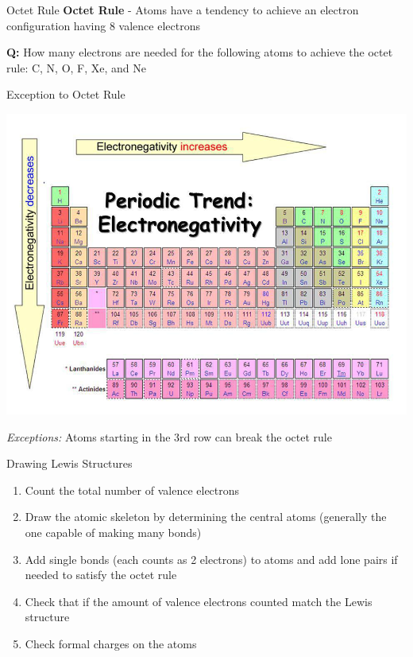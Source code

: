 \documentclass[11pt]{beamer}
\begin{document}
\begin{frame}{Octet Rule}
  \textbf{Octet Rule} - Atoms have a tendency to achieve
  an electron configuration having 8 valence electrons

  \textbf{Q:} How many electrons are needed for the following
  atoms to achieve the octet rule: C, N, O, F, Xe, and Ne
\end{frame}

\begin{frame}{Exception to Octet Rule}
  \begin{center}
    \includegraphics[width=0.75\linewidth]{electronegativity}
  \end{center}
  
  \textit{Exceptions:} Atoms starting in the
    3rd row can break the octet rule

\end{frame}

\begin{frame}{Drawing Lewis Structures}
  \begin{enumerate}
  \item Count the total number of valence electrons
  \item Draw the atomic skeleton by determining the central atoms
    (generally the one capable of making many bonds)
  \item Add single bonds (each counts as 2 electrons) to atoms
    and add lone pairs if needed to satisfy the octet rule
  \item Check that if the amount of valence electrons counted match
    the Lewis structure
  \item Check formal charges on the atoms
  \end{enumerate}
\end{frame}
\end{document}
